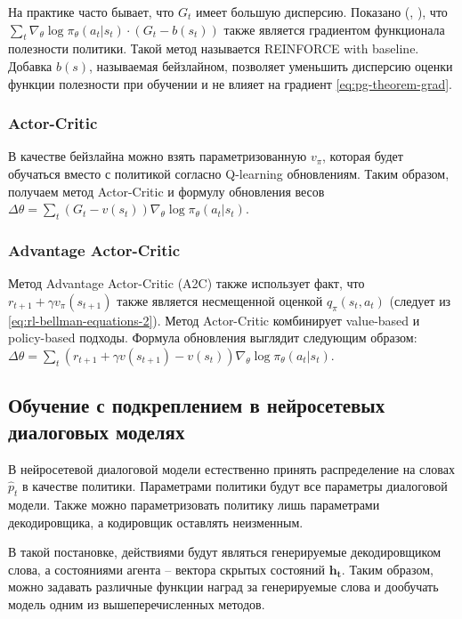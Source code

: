 \documentclass[12pt,a4paper]{amsart}
\begin{document}
На практике часто бывает, что $G_t$ имеет большую дисперсию. Показано (\cite{sutton1998reinforcement}, \cite{sutton1999policy}), что $\sum_{t}\nabla_\theta \log\pi_{\theta}(a_t|s_t) \cdot (G_t - b(s_t)) $ также является градиентом функционала полезности политики. Такой метод называется REINFORCE with baseline. Добавка $b(s)$, называемая бейзлайном, позволяет уменьшить дисперсию оценки функции полезности при обучении и не влияет на градиент \eqref{eq:pg-theorem-grad}.

\subsubsection*{\textbf{Actor-Critic}}

В качестве бейзлайна можно взять параметризованную $v_\pi$, которая будет обучаться вместо с политикой согласно Q-learning обновлениям. Таким образом, получаем метод Actor-Critic и формулу обновления весов $\Delta \theta = \sum_t (G_t - v(s_t)) \nabla_\theta\log\pi_{\theta}(a_t|s_t)$.

\subsubsection*{\textbf{Advantage Actor-Critic}}

Метод Advantage Actor-Critic (A2C) также использует факт, что $r_{t+1} + \gamma v_\pi(s_{t+1})$ также является несмещенной оценкой $q_\pi(s_t, a_t)$ (следует из \eqref{eq:rl-bellman-equations-2}). Метод Actor-Critic комбинирует value-based и policy-based подходы. Формула обновления выглядит следующим образом: $\Delta \theta = \sum_t (r_{t+1} + \gamma v(s_{t+1})  - v(s_t)) \nabla_\theta\log\pi_{\theta}(a_t|s_t)$.

\subsection{Обучение с подкреплением в нейросетевых диалоговых моделях}

В нейросетевой диалоговой модели естественно принять распределение на словах $\hat{p}_t$ в качестве политики. Параметрами политики будут все параметры диалоговой модели. Также можно параметризовать политику лишь параметрами декодировщика, а кодировщик оставлять неизменным.

В такой постановке, действиями будут являться генерируемые декодировщиком слова, а состояниями агента -- вектора скрытых состояний $\mathbf{h_t}$. Таким образом, можно задавать различные функции наград за генерируемые слова и дообучать модель одним из вышеперечисленных методов.
\end{document}
